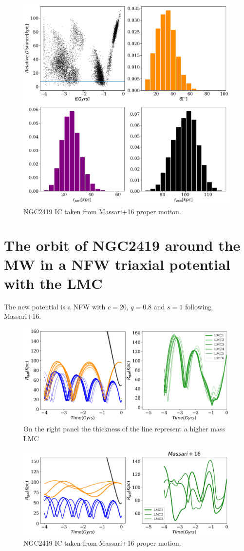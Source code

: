 \documentclass[14pt]{article}
\begin{document}
\begin{figure}[H]
\centering
\includegraphics[scale=0.5]{../exploratory_code/model1_analysis.pdf}
\caption{NGC2419 IC taken from Massari+16 proper motion.}
\end{figure}


\section{The orbit of NGC2419 around the MW in a NFW triaxial
potential with the LMC}


The new potential is a NFW with $c=20$, $q=0.8$ and $s=1$ following
Massari+16.

\begin{figure}[H]
\centering
\includegraphics[scale=0.5]{../exploratory_code/gal_orbits_all_LMCs_Triaxial.pdf}
On the right panel the thickness of the line represent a higher mass
LMC
\end{figure}

\begin{figure}[H]
\centering
\includegraphics[scale=0.5]{../exploratory_code/gal_orbits_all_LMCs_massari_T.pdf}
\caption{NGC2419 IC taken from Massari+16 proper motion.}
\end{figure}
\end{document}
